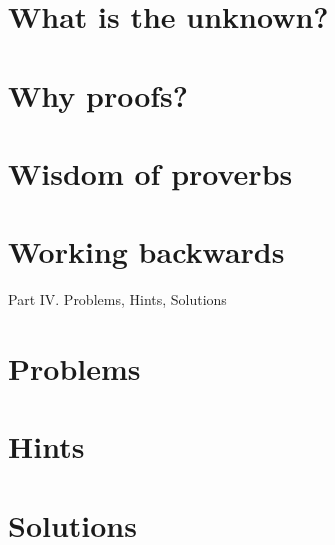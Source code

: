 \documentclass[oneside]{book}
\numberwithin{equation}{section}
\begin{document}
\section{What is the unknown?}

\section{Why proofs?}

\section{Wisdom of proverbs}

\section{Working backwards}

\begin{center}
	\huge Part IV. Problems, Hints, Solutions
\end{center}

\section{Problems}

\section{Hints}

\section{Solutions}




\printbibliography[heading=bibintoc]
	
\end{document}
